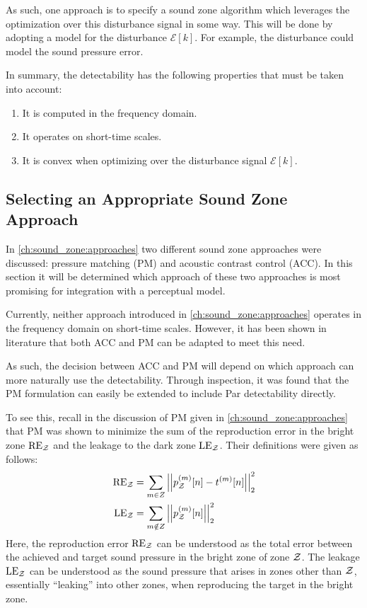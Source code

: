 As such, one approach is to specify a sound zone algorithm which leverages the optimization over this disturbance signal in some way.
This will be done by adopting a model for the disturbance $\mathcal{E}[k]$.
For example, the disturbance could model the sound pressure error.

In summary, the detectability has the following properties that must be taken into account:
\begin{enumerate}
    \item It is computed in the frequency domain.
    \item It operates on short-time scales.
    \item It is convex when optimizing over the disturbance signal $\mathcal{E}[k]$.
\end{enumerate}

\subsection{Selecting an Appropriate Sound Zone Approach}
\label{ch:sound_zones:approach_selection:selection}
In \autoref{ch:sound_zone:approaches} two different sound zone approaches were discussed: pressure matching (PM)
and acoustic contrast control (ACC).
In this section it will be determined which approach of these two approaches is most promising for integration with a perceptual model.

Currently, neither approach introduced in \autoref{ch:sound_zone:approaches} operates in the frequency domain on short-time scales.
However, it has been shown in literature that both ACC and PM can be adapted to meet this need.

As such, the decision between ACC and PM will depend on which approach can more naturally use the detectability.
Through inspection, it was found that the PM formulation can easily be extended to include Par detectability directly.

To see this, recall in the discussion of PM given in \autoref{ch:sound_zone:approaches} that PM was shown to minimize the sum of the 
reproduction error in the bright zone $\text{RE}_{\mathcal{Z}}$ and the leakage to the dark zone $\text{LE}_{\mathcal{Z}}$. 
Their definitions were given as follows:
\begin{align}
    \text{RE}_\zz &= \sum_{m\in Z} \norm[2][2]{p_\zz^{(m)}[n] - t^{(m)}[n]}
    \label{eq:perceptual:approach_selection:errors_RE}\\
    \text{LE}_\zz &= \sum_{m\notin Z} \norm[2][2]{p_\zz^{(m)}[n]} 
    \label{eq:perceptual:approach_selection:errors_LE}
\end{align}
Here, the reproduction error $\text{RE}_{\mathcal{Z}}$ can be understood as the total error between the achieved and target sound pressure in the bright zone of zone $\mathcal{Z}$. 
The leakage $\text{LE}_{\mathcal{Z}}$ can be understood as the sound pressure that arises in zones other than $\mathcal{Z}$, essentially ``leaking'' into other zones,
when reproducing the target in the bright zone.

